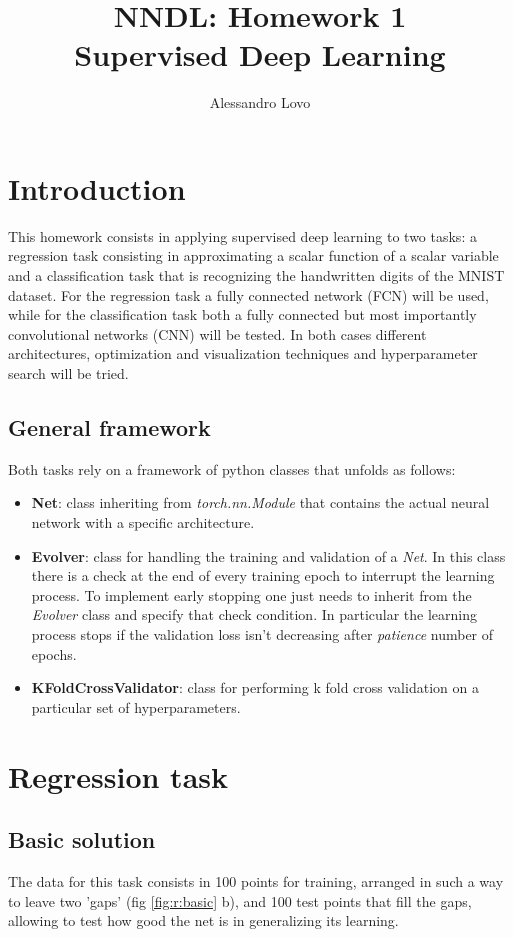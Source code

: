 \documentclass[a4paper, 11pt]{article}
\begin{document}
\title{NNDL: Homework 1 \\ Supervised Deep Learning}
\author{Alessandro Lovo}
\maketitle

\section{Introduction}
  This homework consists in applying supervised deep learning to two tasks: a regression task consisting in approximating a scalar function of a scalar variable and a classification task that is recognizing the handwritten digits of the MNIST dataset. For the regression task a fully connected network (FCN) will be used, while for the classification task both a fully connected but most importantly convolutional networks (CNN) will be tested. In both cases different architectures, optimization and visualization techniques and hyperparameter search will be tried.

  \subsection{General framework}
    Both tasks rely on a framework of python classes that unfolds as follows:
    \begin{itemize}
      \item \textbf{Net}: class inheriting from \emph{torch.nn.Module} that contains the actual neural network with a specific architecture.
      \item \textbf{Evolver}: class for handling the training and validation of a \emph{Net}. In this class there is a check at the end of every training epoch to interrupt the learning process. To implement early stopping one just needs to inherit from the \emph{Evolver} class and specify that check condition. In particular the learning process stops if the validation loss isn't decreasing after \emph{patience} number of epochs.
      \item \textbf{KFoldCrossValidator}: class for performing k fold cross validation on a particular set of hyperparameters.
    \end{itemize}

\section{Regression task}
  \subsection{Basic solution}
    The data for this task consists in 100 points for training, arranged in such a way to leave two 'gaps' (fig \ref{fig:r:basic} b), and 100 test points that fill the gaps, allowing to test how good the net is in generalizing its learning.
\end{document}
